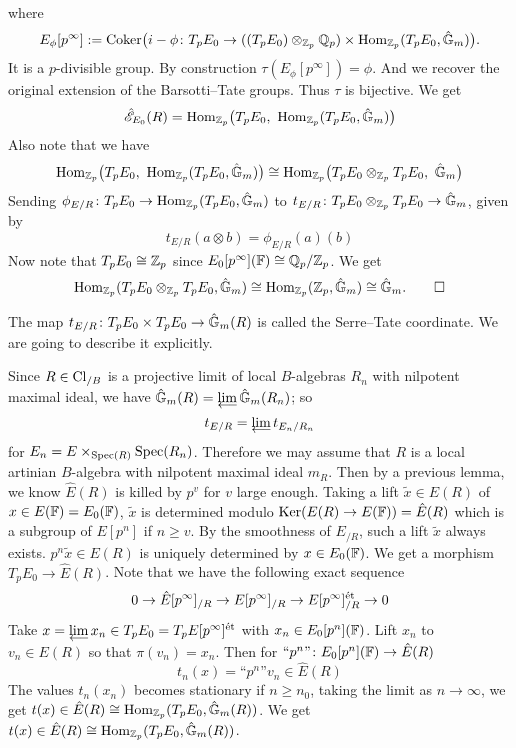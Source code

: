 \documentclass[twoside]{article}
\begin{document}
    where
    \[  E_{\phi}[p^{\infty}]:= \operatorname{Coker} \bigl( i-\phi\colon 
        T_{p}E_{0} \to ((T_{p}E_{0})\otimes_{\mathbb{Z}_{p}} \mathbb{Q}_{p}) \times 
        \operatorname{Hom}_{\mathbb{Z}_{p}}(T_{p}E_{0},\hat{\mathbb{G}}_{m}) \bigr). \]
    It is a $p$-divisible group.
    By construction $\tau(E_{\phi}[p^{\infty}])=\phi$. 
    And we recover the original extension of the Barsotti--Tate groups.
    Thus $\tau$ is bijective. We get 
    \[ \hat{\Eb}_{E_{0}}(R)=\Hom_{\Zb_{p}}\bigl(T_{p}E_{0},\ \Hom_{\Zb_{p}}(T_{p}E_{0},\hat{\Gb}_{m})\bigr)  \]
    Also note that we have 
    \[ \Hom_{\Zb_{p}}\bigl(T_{p}E_{0},\ \Hom_{\Zb_{p}}(T_{p}E_{0},\hat{\Gb}_{m} )\bigr)
        \cong \Hom_{\Zb_{p}} \bigl( T_{p}E_{0}\otimes_{\Zb_{p}} T_{p}E_{0},\ \hat{\Gb}_{m}\bigr) \]
    Sending $\phi_{E/R} \colon  T_{p}E_{0} \to \operatorname{Hom}_{\mathbb{Z}_{p}}(T_{p}E_{0},\hat{\mathbb{G}}_{m} )$ 
    to $t_{E/R}\colon  T_{p}E_{0}\otimes_{\mathbb{Z}_{p}} T_{p}E_{0}\to \hat{\mathbb{G}}_{m} $, given by 
    \[     t_{E/R}(a\otimes b)=\phi_{E/R}(a)(b)           \]
    Now note that $T_{p}E_{0} \cong \mathbb{Z}_{p}$ since $E_{0}[p^{\infty}](\mathbb{F})\cong \mathbb{Q}_{p}/\mathbb{Z}_{p}$.
    We get 
    \[ \operatorname{Hom}_{\mathbb{Z}_{p}}( T_{p}E_{0} \otimes_{\mathbb{Z}_{p}} T_{p}E_{0},\hat{\mathbb{G}}_{m} ) 
    \cong \operatorname{Hom}_{\mathbb{Z}_{p}}(\mathbb{Z}_{p},\hat{\mathbb{G}}_{m} )\cong \hat{\mathbb{G}}_{m}. \qedhere  \]
\epf

The map $t_{E/R}\colon  T_{p}E_{0} \times T_{p}E_{0} \to \hat{\mathbb{G}}_{m}(R)$ 
is called the Serre--Tate coordinate. We are going to describe it explicitly.

Since $R\in \operatorname{Cl}_{/B}$ is a projective limit 
of local $B$-algebras $R_{n}$ with nilpotent maximal ideal,
we have $\hat{\Gb}_{m}(R)=\liminv \hat{\Gb}_{m}(R_{n})$; so 
\[   t_{E/R}=\liminv t_{E_{n}/R_{n}}    \]
for $E_{n}=E\times_{\operatorname{Spec}(R)} \operatorname{Spec}(R_{n})$. Therefore we may assume that 
$R$ is a local artinian $B$-algebra with nilpotent maximal ideal $m_{R}$.
Then by a previous lemma, we know $\hat{E}(R)$ is killed by $p^{v}$ for $v$ large enough.
Taking a lift $\tilde{x} \in E(R)$ of $x\in E(\mathbb{F})=E_{0}(\mathbb{F}) $,
$\tilde{x}$ is determined modulo 
$\operatorname{Ker}(E(R)\to E(\mathbb{F}))=\hat{E}(R)$ which is a subgroup of $E[p^{n}]$ if $n\geq v$.
By the smoothness of $E_{/R}$, such a lift $\tilde{x}$ always exists.
$p^{n}\tilde{x} \in E(R)$ is uniquely determined by $x\in E_{0}(\mathbb{F})$.
We get a morphism $T_{p}E_{0} \to \hat{E}(R)$. Note that we have the following exact sequence 
\[ 0\to \hat{E}[p^{\infty}]_{/R}\to E[p^{\infty}]_{/R} \to E[p^{\infty}]^{\textup{\'et}}_{/R}\to 0 \]
Take $x=\liminv x_{n} \in T_{p}E_{0}=T_{p}E[p^{\infty}]^{\et}$ 
with $x_{n}\in E_{0}[p^{n}](\mathbb{F})$.
Lift $x_{n}$ to $v_{n}\in E(R)$ so that $\pi(v_{n})=x_{n}$.
Then for $\text{``}p^{n}\text{''}\colon E_{0}[p^{n}](\mathbb{F})\to \hat{E}(R)$
\[    t_{n}(x)=\text{``}p^{n}\text{''}v_{n}\in \hat{E}(R)   \]
The values $t_{n}(x_{n})$ becomes stationary if $n\geq n_{0}$,
taking the limit as $n\to \infty$,
we get $t(x)\in \hat{E}(R) \cong \operatorname{Hom}_{\mathbb{Z}_{p}}(T_{p}E_{0},\hat{\mathbb{G}}_{m}(R))$. 
We get $t(x)\in \hat{E}(R)\cong \operatorname{Hom}_{\mathbb{Z}_{p}}(T_{p}E_{0},\hat{\mathbb{G}}_{m}(R))$.
\end{document}
